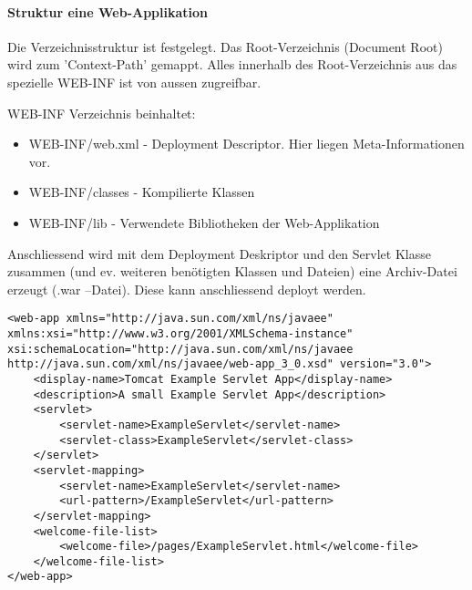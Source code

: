 \paragraph{Struktur eine Web-Applikation}
Die Verzeichnisstruktur ist festgelegt. Das Root-Verzeichnis (Document Root) wird zum 'Context-Path' gemappt. Alles innerhalb des Root-Verzeichnis aus das spezielle WEB-INF ist von aussen zugreifbar.

WEB-INF Verzeichnis beinhaltet:
\begin{itemize}
	\item WEB-INF/web.xml - Deployment Descriptor. Hier liegen Meta-Informationen vor.
	\item WEB-INF/classes - Kompilierte Klassen
	\item WEB-INF/lib - Verwendete Bibliotheken der Web-Applikation
\end{itemize}

Anschliessend wird mit dem Deployment Deskriptor und den Servlet Klasse zusammen (und ev. weiteren benötigten Klassen und Dateien) eine Archiv-Datei erzeugt (.war –Datei). Diese kann anschliessend deployt werden.

\begin{lstlisting}[caption=web.xml Sample]
<web-app xmlns="http://java.sun.com/xml/ns/javaee" xmlns:xsi="http://www.w3.org/2001/XMLSchema-instance" xsi:schemaLocation="http://java.sun.com/xml/ns/javaee http://java.sun.com/xml/ns/javaee/web-app_3_0.xsd" version="3.0">
	<display-name>Tomcat Example Servlet App</display-name>
	<description>A small Example Servlet App</description>
	<servlet>
		<servlet-name>ExampleServlet</servlet-name>
		<servlet-class>ExampleServlet</servlet-class>
	</servlet>
	<servlet-mapping>
		<servlet-name>ExampleServlet</servlet-name>
		<url-pattern>/ExampleServlet</url-pattern>
	</servlet-mapping>
	<welcome-file-list>
		<welcome-file>/pages/ExampleServlet.html</welcome-file>
	</welcome-file-list>
</web-app>
\end{lstlisting}


